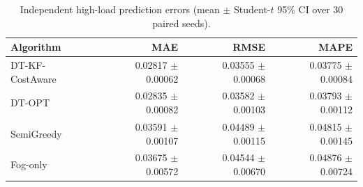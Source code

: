 \begin{table}[t]
\centering
\caption{Independent high-load prediction errors (mean $\pm$ Student-$t$ 95\% CI over 30 paired seeds).}
\label{tab:independent_high_prediction}
\begin{tabular}{lrrr}
\toprule
Algorithm & MAE & RMSE & MAPE \\
\midrule
DT-KF-CostAware & 0.02817 $\pm$ 0.00062 & 0.03555 $\pm$ 0.00068 & 0.03775 $\pm$ 0.00084 \\
DT-OPT & 0.02835 $\pm$ 0.00082 & 0.03582 $\pm$ 0.00103 & 0.03793 $\pm$ 0.00112 \\
SemiGreedy & 0.03591 $\pm$ 0.00107 & 0.04489 $\pm$ 0.00115 & 0.04815 $\pm$ 0.00145 \\
Fog-only & 0.03675 $\pm$ 0.00572 & 0.04544 $\pm$ 0.00670 & 0.04876 $\pm$ 0.00724 \\
\bottomrule
\end{tabular}
\end{table}

